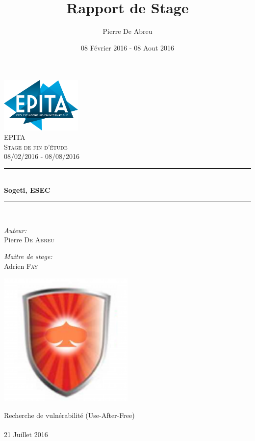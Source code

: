 \documentclass[a4paper, 12pt]{report}
\title{Rapport de Stage}
\author{Pierre De Abreu}
\date{08 Février 2016 - 08 Aout 2016}
\newcommand{\HRule}{\rule{\linewidth}{0.5mm}}
\begin{document}
 
\begin{titlepage}
\begin{center}

\includegraphics[width=0.3\textwidth]{epita.png}~\\[1cm]

\textsc{\LARGE EPITA}\\[1.5cm]

\textsc{\Large Stage de fin d'étude}\\[0.5cm]
\textsc{\Large 08/02/2016 - 08/08/2016}

\HRule \\[0.4cm]
{ \huge \bfseries Sogeti, ESEC \\[0.4cm] }

\HRule \\[1.5cm]

\begin{minipage}{0.4\textwidth}
\begin{flushleft} \large
\emph{Auteur:}\\
Pierre \textsc{De Abreu}
\end{flushleft}
\end{minipage}
\begin{minipage}{0.4\textwidth}
\begin{flushright} \large
\emph{Maitre de stage:} \\
Adrien \textsc{Fay}
\end{flushright}
\end{minipage}

\includegraphics[width=0.5\textwidth]{esec.png}~\\[1cm]

\vfill

{\large Recherche de vulnérabilité (Use-After-Free)\paragraph{}}
{\large 21 Juillet 2016}

\end{center}
\end{titlepage}
\end{document}
